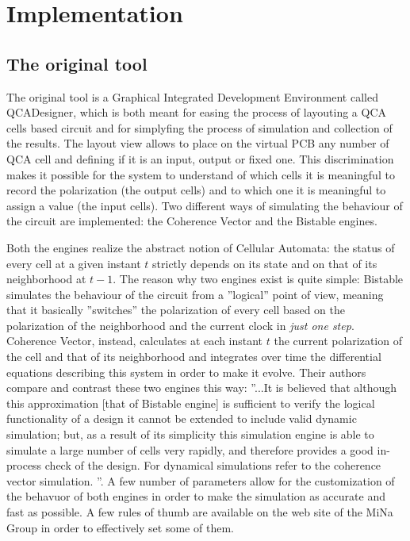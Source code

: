 \chapter{Implementation}\label{sec:implementation}
\section {The original tool}
The original tool is a Graphical Integrated Development Environment called QCADesigner, which is both meant for easing the process of layouting a QCA cells based circuit and for simplyfing the process of simulation and collection of the results. The layout view allows to place on the virtual PCB any number of QCA cell and defining if it is an input, output or fixed one. This discrimination makes it possible for the system to understand of which cells it is meaningful to record the polarization (the output cells) and to which one it is meaningful to assign a value (the input cells). Two different ways of simulating the behaviour of the circuit are implemented: the Coherence Vector and the Bistable engines. 

Both the engines realize the abstract notion of Cellular Automata: the status of every cell at a given instant $t$ strictly depends on its state and on that of its neighborhood at $t-1$. The reason why two engines exist is quite simple: Bistable simulates the behaviour of the circuit from a ''logical'' point of view, meaning that it basically ''switches'' the polarization of every cell based on the polarization of the neighborhood and the current clock in \textsl{just one step}. Coherence Vector, instead, calculates at each instant $t$ the current polarization of the cell and that of its neighborhood and integrates over time the differential equations describing this system in order to make it evolve. Their authors compare and contrast these two engines this way: ''...It is believed that although this approximation [that of Bistable engine] is sufficient to verify the logical functionality of a design it cannot be extended to include valid dynamic simulation; but, as a result of its simplicity this simulation engine is able to simulate a large number of cells very rapidly, and therefore provides a good in-process check of the design. For dynamical simulations refer to the coherence vector simulation. ''. A few number of parameters allow for the customization of the behavuor of both engines in order to make the simulation as accurate and fast as possible. A few rules of thumb are available on the web site of the MiNa Group in order to effectively set some of them.

